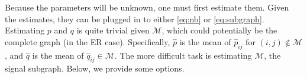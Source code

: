 \documentclass[10pt,journal,cspaper,compsoc]{IEEEtran}
\providecommand{\mc}[1]{\mathcal{#1}}
\providecommand{\mh}[1]{\hat{#1}}
\begin{document}
Because the parameters will be unknown, one must first estimate them.  Given the estimates, they can be plugged in to either \eqref{eq:nb} or \eqref{eq:subgraph}.  Estimating $p$ and $q$ is quite trivial given $\mc{M}$, which could potentially be the complete graph (in the ER case).  Specifically, $\mh{p}$ is the mean of $\mh{p}_{ij}$ for $(i,j) \notin \mc{M}$, and $\mh{q}$ is the mean of $\mh{q}_{ij} \in \mc{M}$.  The more difficult task is estimating $\mc{M}$, the signal subgraph.  Below, we provide some options.


\end{document}

